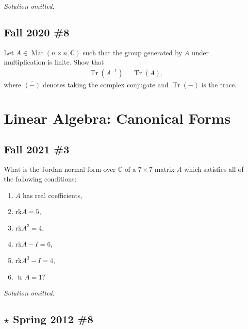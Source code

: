 \emph{Solution omitted.}

\hypertarget{fall-2020-8}{%
\subsection{Fall 2020 \#8}\label{fall-2020-8}}

Let \(A\in \operatorname{Mat}(n\times n, {\mathbb{C}})\) such that the
group generated by \(A\) under multiplication is finite. Show that
\begin{align*}
\operatorname{Tr}(A^{-1}) ={\overline{{\operatorname{Tr}(A) }}}
,\end{align*}
where \({\overline{{({-})}}}\) denotes taking the complex conjugate and
\(\operatorname{Tr}({-})\) is the trace.

\hypertarget{linear-algebra-canonical-forms}{%
\section{Linear Algebra: Canonical
Forms}\label{linear-algebra-canonical-forms}}

\hypertarget{fall-2021-3}{%
\subsection{Fall 2021 \#3}\label{fall-2021-3}}

What is the Jordan normal form over \(\mathbb{C}\) of a \(7 \times 7\)
matrix \(A\) which satisfies all of the following conditions:

\begin{enumerate}
\def\labelenumi{\alph{enumi}.}
\item
  \(A\) has real coefficients,
\item
  \(\mathrm{rk} A=5\),
\item
  \(\mathrm{rk} A^{2}=4\),
\item
  \(\mathrm{rk} A-I=6\),
\item
  \(\mathrm{rk} A^{3}-I=4\),
\item
  \(\operatorname{tr} A=1 ?\)
\end{enumerate}

\emph{Solution omitted.}

\hypertarget{star-spring-2012-8}{%
\subsection{\texorpdfstring{\(\star\) Spring 2012
\#8}{\textbackslash star Spring 2012 \#8}}\label{star-spring-2012-8}}

